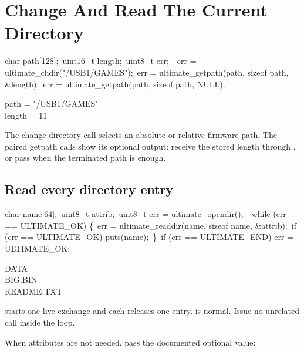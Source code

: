 
\section{Change And Read The Current Directory}

\begin{listingbox}
char path[128];\
uint16\_t length;\
uint8\_t err;\
\
err = ultimate\_chdir("/USB1/GAMES");\
err = ultimate\_getpath(path, sizeof path, \&length);\
err = ultimate\_getpath(path, sizeof path, NULL);
\end{listingbox}

\begin{resultbox}
path = "/USB1/GAMES"\\
length = 11
\end{resultbox}

The change-directory call selects an absolute or relative firmware path. The
paired getpath calls show its optional output: receive the stored length
through \cmd{\&length}, or pass  when the terminated path is enough.

\subsection*{Read every directory entry}

\begin{listingbox}
char name[64];\
uint8\_t attrib;\
uint8\_t err = ultimate\_opendir();\
\
while (err == ULTIMATE\_OK) \{\
\hspace*{1em}err = ultimate\_readdir(name, sizeof name, \&attrib);\
\hspace*{1em}if (err == ULTIMATE\_OK) puts(name);\
\}\
if (err == ULTIMATE\_END) err = ULTIMATE\_OK;
\end{listingbox}

\begin{outputbox}
DATA\\
BIG.BIN\\
README.TXT
\end{outputbox}

 starts one live exchange and each
\cmd{ultimate\_readdir()} releases one entry.  is normal.
Issue no unrelated call inside the loop.

When attributes are not needed, pass the documented optional value:

